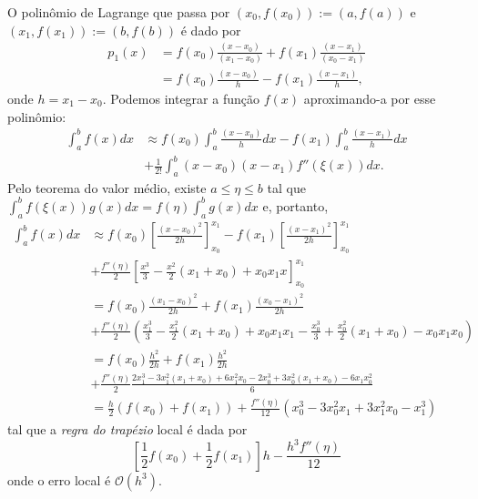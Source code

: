 O polinômio de Lagrange que passa por $(x_0,f(x_0)):=(a,f(a))$ e $(x_1,f(x_1)):=(b,f(b))$ é dado por
\begin{eqnarray} 
p_1(x) &=\displaystyle f(x_0)\frac{(x-x_0)}{(x_1-x_0)}+f(x_1)\frac{(x-x_1)}{(x_0-x_1)} \\
       &=\displaystyle f(x_0)\frac{(x-x_0)}{h}-f(x_1)\frac{(x-x_1)}{h}, 
\end{eqnarray}
onde $h=x_1-x_0$. Podemos integrar a função $f(x)$ aproximando-a por esse polinômio:
\begin{equation*}
  \begin{split}
    \int_a^bf(x)dx &\approx f(x_0)\int_a^b\frac{(x-x_0)}{h}dx-f(x_1)\int_a^b\frac{(x-x_1)}{h}dx\\
    &+\frac{1}{2!}\int_a^b(x-x_0)(x-x_1)f''(\xi(x))dx.   
  \end{split}
\end{equation*}
Pelo teorema do valor médio, existe $a\leq \eta\leq b$ tal que $\int_a^bf(\xi(x))g(x)dx=f(\eta)\int_a^bg(x)dx$ e, portanto,
\begin{equation*}
  \begin{split}
    \int_a^bf(x)dx&\approx f(x_0)\left[\frac{(x-x_0)^2}{2h}\right]_{x_0}^{x_1}-f(x_1)\left[\frac{(x-x_1)^2}{2h}\right]_{x_0}^{x_1}\\
    &+ \frac{f''(\eta)}{2}\left[\frac{x^3}{3}-\frac{x^2}{2}(x_1+x_0)+x_0x_1x\right]_{x_0}^{x_1}\\
&= f(x_0)\frac{(x_1-x_0)^2}{2h}+f(x_1)\frac{(x_0-x_1)^2}{2h}\\
&+ \frac{f''(\eta)}{2}\left(\frac{x_1^3}{3}-\frac{x_1^2}{2}(x_1+x_0)+x_0x_1x_1-\frac{x_0^3}{3}+\frac{x_0^2}{2}(x_1+x_0)-x_0x_1x_0\right)\\
&= f(x_0)\frac{h^2}{2h}+f(x_1)\frac{h^2}{2h}\\
&+ \frac{f''(\eta)}{2}\frac{2x_1^3-3x_1^2(x_1+x_0)+6x_1^2x_0-2x_0^3+3x_0^2(x_1+x_0)-6x_1x_0^2}{6}\\
&= \frac{h}{2}(f(x_0)+f(x_1))+\frac{f''(\eta)}{12}\left(x_0^3-3x_0^2x_1+3x_1^2x_0-x_1^3\right)
  \end{split}
\end{equation*}
tal que a \emph{regra do trapézio} local é dada por
\begin{equation}
  \left[\frac{1}{2}f(x_0)+\frac{1}{2}f(x_1)\right]h-\frac{h^3f''(\eta)}{12}    
\end{equation}
onde o erro local é $\mathcal{O}(h^3)$.

